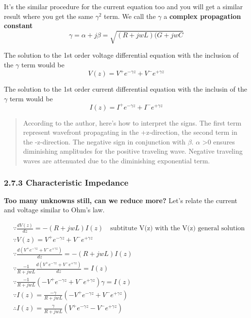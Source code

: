 \documentclass[11pt]{article}
\begin{document}
    It's the similar procedure for the current equation too and you will get
a similar result where you get the same \(\gamma^2\) term. We call the
\(\gamma\) a \textbf{complex propagation constant}
\[\gamma = \alpha+j\beta = \sqrt{(R+jwL)(G+jwC}\]

    The solution to the 1st order voltage differential equation with the
inclusion of the \(\gamma\) term would be
\[V(z)=V^{+}e^{-\gamma z}+V^{-}e^{+\gamma z}\]

    The solution to the 1st order current differential equation with the
inclusin of the \(\gamma\) term would be
\[I(z)=I^{+}e^{-\gamma z}+I^{-}e^{+\gamma z}\]

    \begin{quote}
According to the author, here's how to interpret the signs. The first
term represent wavefront propagating in the +z-direction, the second
term in the -z-direction. The negative sign in conjunction with
\(\beta\). \(\alpha\) \textgreater{}0 ensures diminishing amplitudes for
the positive traveling wave. Negative traveling waves are attenuated due
to the diminishing exponential term.
\end{quote}

    \hypertarget{characteristic-impedance}{%
\subsubsection{2.7.3 Characteristic
Impedance}\label{characteristic-impedance}}

\textbf{Too many unknowns still, can we reduce more?} Let's relate the
current and voltage similar to Ohm's law.

    \[
\begin{align}
&\because \frac{dV(z)}{dz}=-(R+jwL)I(z) \quad \text{subtitute V(z) with the V(z) general solution}\\
&\because V(z)=V^{+}e^{-\gamma z}+V^{-}e^{+\gamma z} \\
&\because \frac{d(V^{+}e^{-\gamma z}+V^{-}e^{+\gamma z})}{dz}=-(R+jwL)I(z) \\
&\because \frac{-1}{R+jwL}\frac{d(V^{+}e^{-\gamma z}+V^{-}e^{+\gamma z})}{dz} = I(z) \\
&\because \frac{-1}{R+jwL}(-V^{+}e^{-\gamma z}+V^{-}e^{+\gamma z})\gamma = I(z) \\
&\because I(z) = \frac{-\gamma}{R+jwL}(-V^{+}e^{-\gamma z}+V^{-}e^{+\gamma z})\\
&\therefore I(z) = \frac{\gamma}{R+jwL}(V^{+}e^{-\gamma z}-V^{-}e^{+\gamma z})
\end{align}
\]
\end{document}
